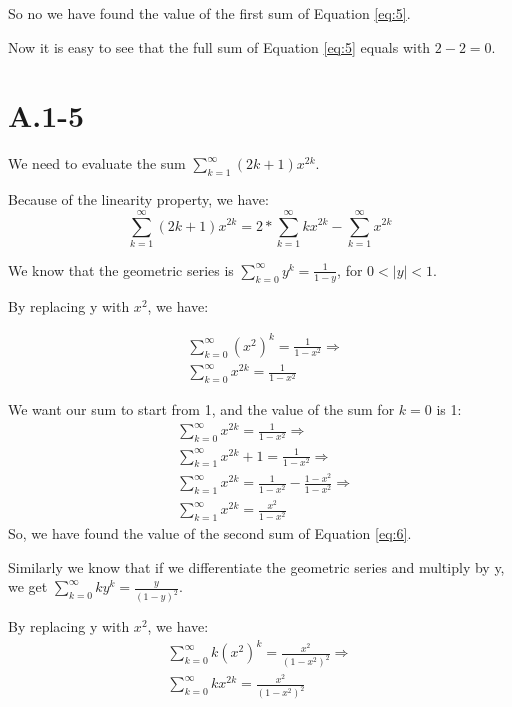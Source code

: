 \documentclass{article}
\begin{document}
So no we have found the value of the first sum of Equation \ref{eq:5}.

Now it is easy to see that the full sum of Equation \ref{eq:5} equals with $2 - 2 = 0$.

\section*{A.1-5}
We need to evaluate the sum $\sum_{k=1}^{\infty}{(2k+1)x^{2k}}$.

Because of the linearity property, we have:
\begin{equation} \label{eq:6}
    \sum_{k=1}^{\infty}{(2k+1)x^{2k}} = 2 * \sum_{k=1}^{\infty}{k x^{2k}} - \sum_{k=1}^{\infty}{x^{2k}} 
\end{equation}

We know that the geometric series is $\sum_{k=0}^{\infty}{y^{k}} = \frac{1}{1 - y}$, for $0 < |y| < 1$.

By replacing y with $x^{2}$, we have:

\begin{align*}
    &\sum_{k=0}^{\infty}{(x^{2})^{k}} = \frac{1}{1-x^{2}} \Rightarrow\\
    &\sum_{k=0}^{\infty}{x^{2k}} = \frac{1}{1-x^{2}} 
\end{align*}

We want our sum to start from 1, and the value of the sum for $k = 0$ is 1:
\begin{align*}
    &\sum_{k=0}^{\infty}{x^{2k}} = \frac{1}{1-x^{2}} \Rightarrow \\
    &\sum_{k=1}^{\infty}{x^{2k}} + 1 = \frac{1}{1-x^{2}} \Rightarrow \\
    &\sum_{k=1}^{\infty}{x^{2k}} = \frac{1}{1-x^{2}} - \frac{1-x^{2}}{1-x^{2}} \Rightarrow \\
    &\sum_{k=1}^{\infty}{x^{2k}} = \frac{x^{2}}{1-x^{2}}
\end{align*}
So, we have found the value of the second sum of Equation \ref{eq:6}.

Similarly we know that if we differentiate the geometric series and multiply by y, we get $\sum_{k=0}^{\infty}{ky^{k}} = \frac{y}{(1 - y)^2}$.

By replacing y with $x^{2}$, we have:
\begin{align*}
    \sum_{k=0}^{\infty}{k(x^{2})^{k}} = \frac{x^{2}}{(1-x^{2})^{2}} \Rightarrow\\
    \sum_{k=0}^{\infty}{kx^{2k}} = \frac{x^{2}}{(1-x^{2})^{2}} 
\end{align*}
\end{document}
